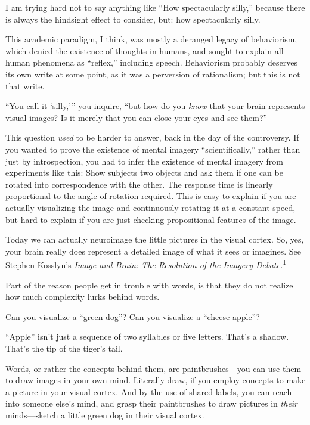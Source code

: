{
 I am trying hard not to say anything like ``How
spectacularly silly,'' because there is always the
hindsight effect to consider, but: how spectacularly silly.}

{
 This academic paradigm, I think, was mostly a deranged legacy of
behaviorism, which denied the existence of thoughts in humans, and
sought to explain all human phenomena as
``reflex,'' including speech.
Behaviorism probably deserves its own write at some point, as it was a
perversion of rationalism; but this is not that write.}

{
 ``You call it
`silly,''' you
inquire, ``but how do you \textit{know} that your
brain represents visual images? Is it merely that you can close your
eyes and see them?''}

{
 This question \textit{used} to be harder to answer, back in the
day of the controversy. If you wanted to prove the existence of mental
imagery ``scientifically,'' rather
than just by introspection, you had to infer the existence of mental
imagery from experiments like this: Show subjects two objects and ask
them if one can be rotated into correspondence with the other. The
response time is linearly proportional to the angle of rotation
required. This is easy to explain if you are actually visualizing the
image and continuously rotating it at a constant speed, but hard to
explain if you are just checking propositional features of the image.}

{
 Today we can actually neuroimage the little pictures in the visual
cortex. So, yes, your brain really does represent a detailed image of
what it sees or imagines. See Stephen Kosslyn's
\textit{Image and Brain: The Resolution of the Imagery
Debate.}\textsuperscript{1}}

{
 Part of the reason people get in trouble with words, is that they
do not realize how much complexity lurks behind words.}

{
 Can you visualize a ``green
dog''? Can you visualize a ``cheese
apple''?}

{
 ``Apple'' isn't
just a sequence of two syllables or five letters.
That's a shadow. That's the tip of the
tiger's tail.}

{
 Words, or rather the concepts behind them, are paintbrushes---you
can use them to draw images in your own mind. Literally draw, if you
employ concepts to make a picture in your visual cortex. And by the use
of shared labels, you can reach into someone else's
mind, and grasp their paintbrushes to draw pictures in \textit{their}
minds---sketch a little green dog in their visual cortex.}

